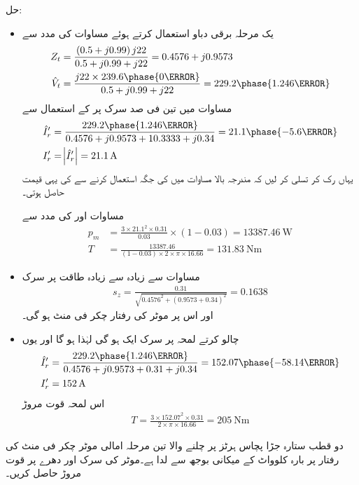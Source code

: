 حل:
\begin{itemize}
\item
 یک مرحلہ  برقی دباو   استعمال کرتے ہوئے مساوات   کی مدد سے
\begin{align*}
Z_t&=\frac{\left(0.5+j 0.99 \right) j 22}{0.5+j 0.99+j 22}=0.4576+j 0.9573\\
\hat{V}_t&=\frac{j 22 \times 239.6 \phase{0\degree}}{0.5+j 0.99+j 22}=229.2\phase{1.246\degree}
\end{align*}
مساوات   میں  تین فی صد سرک پر  کے استعمال سے
\begin{align*}
\hat{I}_r'&=\frac{229.2 \phase{1.246\degree}}{0.4576+j 0.9573+10.3333+j 0.34}=21.1\phase{-5.6\degree}\\
I_r'&=\abs{\hat{I}_r'}=\SI{21.1}{\ampere}
\end{align*}
یہاں رک کر تسلی کر لیں کہ مندرجہ بالا مساوات میں  کی جگہ  استعمال کرنے سے  کی یہی قیمت حاصل ہوتی۔

مساوات   اور   کی مدد سے
\begin{align*}
p_m&=\frac{3\times 21.1^2\times 0.31}{0.03} \times (1-0.03)=\SI{13387.46}{\watt}\\
T&=\frac{13387.46}{(1-0.03) \times 2\times \pi \times 16.66}=\SI{131.83}{\newton \meter}
\end{align*}
%
\item
مساوات   سے زیادہ سے زیادہ طاقت پر سرک
\begin{align*}
s_z=\frac{0.31}{\sqrt{0.4576^2+(0.9573+0.34)^2}}=0.1638
\end{align*}
اور اس پر موٹر کی رفتار  چکر فی منٹ ہو گی۔
\item
چالو کرتے لمحہ پر سرک ایک ہو گی لہٰذا  ہو گا اور یوں
\begin{align*}
\hat{I}_r'&=\frac{229.2 \phase{1.246\degree}}{0.4576+j 0.9573+0.31+j 0.34}=152.07\phase{-58.14\degree}\\
I_r'&=\SI{152}{\ampere}
\end{align*}
اس لمحہ قوت مروڑ
\begin{align*}
T=\frac{3 \times 152.07^2 \times 0.31}{2 \times \pi \times 16.66}=\SI{205}{\newton \meter}
\end{align*}
\end{itemize}
%
دو قطب ستارہ جڑا پچاس ہرٹز پر چلنے والا تین مرحلہ امالی موٹر   چکر فی منٹ کی رفتار پر بارہ کلوواٹ کے میکانی بوجھ سے لدا ہے۔موٹر کی سرک اور دھرے پر قوت مروڑ  حاصل کریں۔

